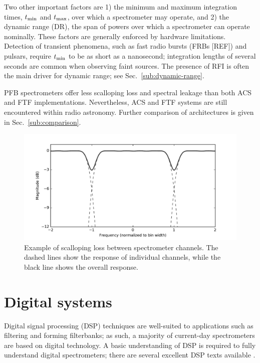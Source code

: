 \documentclass{ws-rv961x669}
\begin{document}
Two other important factors are 1) the minimum and maximum integration times, $t_{\rm{min}}$ and $t_{\rm{max}}$, over which a spectrometer may operate, and 2) the dynamic range (DR), the span of powers over which a spectrometer can operate nominally. These factors are generally enforced by hardware limitations. Detection of transient phenomena, such as fast radio bursts (FRBs [REF]) and pulsars, require $t_{\rm{min}}$ to be as short as a nanosecond; integration lengths of several seconds are common when observing faint sources. The presence of RFI is often the main driver for dynamic range; see Sec.~\ref{sub:dynamic-range}.

PFB spectrometers offer less scalloping loss and spectral leakage than both ACS and FTF implementations. Nevertheless, ACS and FTF systems are still encountered within radio astronomy. Further comparison of architectures is given in Sec.~\ref{sub:comparison}.

\begin{figure}
 \centering
 \includegraphics[width=\textwidth]{./figures/pfb_scalloping}
 \caption{Example of scalloping loss between spectrometer channels. The dashed lines show the response of individual channels, while the black line shows the overall response.\label{fig:scalloping}}
\end{figure}


\section{Digital systems}

Digital signal processing (DSP) techniques are well-suited to applications such as filtering and forming filterbanks; as such, a majority of current-day spectrometers are based on digital technology. A basic understanding of DSP is required to fully understand digital spectrometers; there are several excellent DSP texts available \citet{bookLyonsDSP, BookSmithDSP}. 
\end{document}
